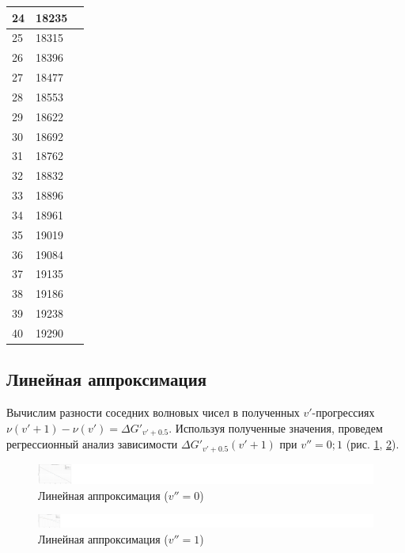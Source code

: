 \begin{longtable}[h!]{|p{1cm}|p{3cm}|p{3cm}|}
	\hline
	24 & 18235 &  \bigstrut\\
	\hline
	25 & 18315 &  \bigstrut\\
	\hline
	26 & 18396 &  \bigstrut\\
	\hline
	27 & 18477 &  \bigstrut\\
	\hline
	28 & 18553 &  \bigstrut\\
	\hline
	29 & 18622 &  \bigstrut\\
	\hline
	30 & 18692 &  \bigstrut\\
	\hline
	31 & 18762 &  \bigstrut\\
	\hline
	32 & 18832 &  \bigstrut\\
	\hline
	33 & 18896 &  \bigstrut\\
	\hline
	34 & 18961 &  \bigstrut\\
	\hline
	35 & 19019 &  \bigstrut\\
	\hline
	36 & 19084 &  \bigstrut\\
	\hline
	37 & 19135 &  \bigstrut\\
	\hline
	38 & 19186 &  \bigstrut\\
	\hline
	39 & 19238 &  \bigstrut\\
	\hline
	40 & 19290 &  \bigstrut\\
	\hline
\end{longtable}
\subsection{Линейная аппроксимация}
Вычислим разности соседних волновых чисел в полученных $v'$-прогрессиях \\$\nu(v'+1)-\nu(v')= \Delta G'_{v'+0.5}$. Используя полученные значения, проведем регрессионный анализ зависимости $\Delta G'_{v'+0.5}(v'+1)$ при $v'' = 0; 1$ (рис. \ref{deltaG0}, \ref{deltaG1}).

\begin{figure}[h!]
	\centering
	\includegraphics[width=0.81\linewidth]{data/deltaG(v_0).pdf}
	\caption{Линейная аппроксимация ($v''=0$)}
	\label{deltaG0}
\end{figure}
\begin{figure}[h!]
	\centering
	\includegraphics[width=0.79\linewidth]{data/deltaG(v_1).pdf}
	\caption{Линейная аппроксимация ($v''=1$)}
	\label{deltaG1}
\end{figure}

